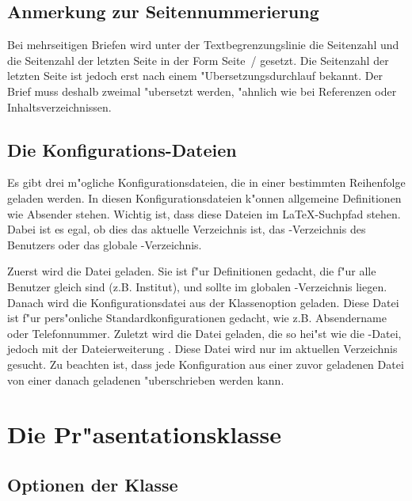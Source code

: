 \documentclass[twoside,colorback,accentcolor=tud4c,11pt]{tudreport}
\begin{document}
  \section{Anmerkung zur Seitennummerierung}
    Bei mehrseitigen Briefen wird unter der Textbegrenzungslinie die Seitenzahl und die Seitenzahl
    der letzten Seite in der Form \mbox{\textsf{Seite}
    \textsf{/}} gesetzt. Die Seitenzahl der letzten
    Seite ist jedoch erst nach einem "Ubersetzungsdurchlauf bekannt. Der Brief muss deshalb zweimal
    "ubersetzt werden, "ahnlich wie bei Referenzen oder Inhaltsverzeichnissen.

  \section{Die Konfigurations-Dateien}\label{sec:tudletter:adr}
    Es gibt drei m"ogliche Konfigurationsdateien, die in einer bestimmten Reihenfolge geladen
    werden. In diesen Konfigurationsdateien k"onnen allgemeine Definitionen wie Absender stehen.
    Wichtig ist, dass diese Dateien im \LaTeX{}-Suchpfad stehen. Dabei ist es egal, ob dies das
    aktuelle Verzeichnis ist, das -Verzeichnis des Benutzers oder das globale
    -Verzeichnis.
    
    Zuerst wird die Datei  geladen. Sie ist f"ur Definitionen gedacht,
    die f"ur alle Benutzer gleich sind (z.B. Institut), und sollte im globalen -Verzeichnis
    liegen. Danach wird die Konfigurationsdatei aus der Klassenoption
    \mbox{} geladen. Diese Datei ist f"ur
    pers"onliche
    Standardkonfigurationen gedacht, wie z.B. Absendername oder Telefonnummer. Zuletzt wird die
    Datei geladen, die so hei"st wie die -Datei, jedoch mit der Dateierweiterung
    . Diese Datei wird nur im aktuellen Verzeichnis gesucht.
    Zu beachten ist, dass jede Konfiguration aus einer zuvor geladenen Datei von einer danach
    geladenen "uberschrieben werden kann.

\chapter{Die Pr"asentationsklasse \texorpdfstring{}{tudbeamer}}\label{chap:tudbeamer}

  \section{Optionen der Klasse \texorpdfstring{}{tudbeamer}}
    
\end{document}
